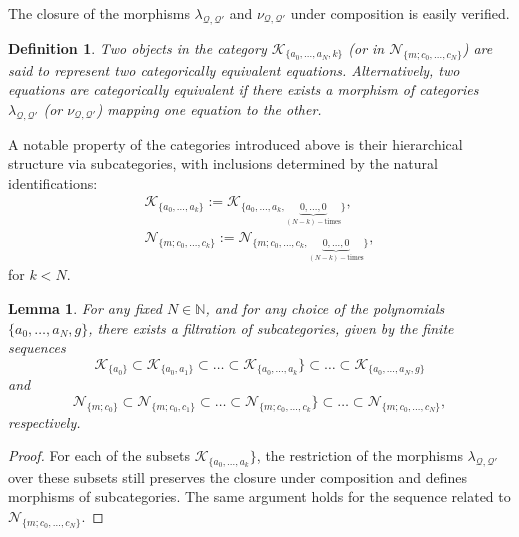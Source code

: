 \documentclass[10pt]{amsart}
\numberwithin{equation}{section}
\newtheorem{definition}{Definition}
\newtheorem{lemma}{Lemma}
\theoremstyle{definition}
\begin{document}
 The closure of the morphisms $\lambda _{\mathcal{Q},\mathcal{Q}'}$ and
$\nu _{\mathcal{Q},\mathcal{Q}'}$ under composition is easily verified.
\begin{definition}
\label{defn9}
Two objects in the category
$\mathcal{K}_{\{ a_{0},\ldots , a_{N},k\}}$ (or in
$\mathcal{N}_{\{m; c_{0},\ldots , c_{N}\}}$) are said to represent two
categorically equivalent equations. Alternatively, two equations are categorically
equivalent if there exists a morphism of categories
$\lambda _{\mathcal{Q},\mathcal{Q}'}$ (or
$\nu _{\mathcal{Q},\mathcal{Q}'}$) mapping one equation to the other.
\end{definition}
A notable property of the categories introduced above is their hierarchical
structure via subcategories, with inclusions determined by the natural
identifications:
\begin{eqnarray*}
\mathcal{K}_{\{ a_{0},\ldots , a_{k}\}}:= \mathcal{K}_{\{ a_{0},
\ldots , a_{k},\underbrace{0,\ldots ,0}_{(N-k)-\mathrm{times}}\}},
\\
\mathcal{N}_{\{m; c_{0},\ldots , c_{k}\}}:= \mathcal{N}_{\{ m; c_{0},
\ldots , c_{k},\underbrace{0,\ldots ,0}_{(N-k)-\mathrm{times}}\}},
\end{eqnarray*}
for $k<N$.
\begin{lemma}
\label{lem1}
For any fixed $N\in \mathbb{N}$, and for any choice of the polynomials
$\{ a_{0},\ldots , a_{N},g\}$, there exists a filtration of subcategories,
given by the finite sequences
\begin{equation}
\mathcal{K}_{\{ a_{0}\}}\subset \mathcal{K}_{\{ a_{0},a_{1}\}}
\subset \ldots \subset \mathcal{K}_{\{ a_{0},\ldots , a_{k}}\}
\subset \ldots \subset \mathcal{K}_{\{ a_{0},\ldots , a_{N},g\}}
\label{filtrF}
\end{equation}
and
\begin{equation}
\mathcal{N}_{\{m; c_{0}\}}\subset \mathcal{N}_{\{m; c_{0},c_{1}\}}
\subset \ldots \subset \mathcal{N}_{\{m; c_{0},\ldots , c_{k}}\}
\subset \ldots \subset \mathcal{N}_{\{m; c_{0},\ldots , c_{N}\}},
\label{filtrG}
\end{equation}
respectively.
\end{lemma}
\begin{proof}
For each of the subsets $\mathcal{K}_{\{ a_{0},\ldots , a_{k}}\}$, the
restriction of the morphisms $\lambda _{\mathcal{Q},\mathcal{Q}'}$ over
these subsets still preserves the closure under composition and defines
morphisms of subcategories. The same argument holds for the sequence related
to $\mathcal{N}_{\{m;c_{0},\ldots , c_{N}\}}$.
\end{proof}
\end{document}
